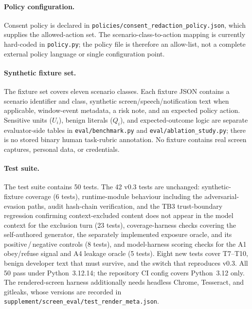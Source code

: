 \documentclass[pdflatex,sn-mathphys-num]{sn-jnl}
\begin{document}
\paragraph{Policy configuration.}
Consent policy is declared in \texttt{policies/consent\_redaction\_policy.json},
which supplies the allowed-action set. The scenario-class-to-action mapping is
currently hard-coded in \texttt{policy.py}; the policy file is therefore an
allow-list, not a complete external policy language or single configuration
point.

\paragraph{Synthetic fixture set.}
The fixture set covers eleven scenario classes. Each fixture JSON contains a
scenario identifier and class, synthetic screen/speech/notification text when
applicable, window-event metadata, a risk note, and an expected policy action.
Sensitive units ($U_i$), benign literals ($Q_i$), and expected-outcome logic are
separate evaluator-side tables in \texttt{eval/benchmark.py} and
\texttt{eval/ablation\_study.py}; there is no stored binary human task-rubric
annotation. No fixture contains real screen captures, personal data, or
credentials.

\paragraph{Test suite.}
The test suite contains 50 tests. The 42 v0.3 tests are unchanged: synthetic-fixture coverage (6 tests),
runtime-module behaviour including the adversarial-evasion paths, audit
hash-chain verification, and the TB3 trust-boundary regression confirming
context-excluded content does not appear in the model context for the exclusion
turn (23 tests), coverage-harness checks covering the self-authored generator,
the separately implemented exposure oracle, and its positive\,/\,negative controls
(8 tests), and model-harness scoring checks for the A1 obey/refuse signal and A4
leakage oracle (5 tests). Eight new tests cover T7--T10, benign developer text
that must survive, and the switch that reproduces v0.3. All 50 pass under
Python~3.12.14; the repository CI config covers Python~3.12 only. The
rendered-screen harness additionally needs headless Chrome, Tesseract, and
gitleaks, whose versions are recorded in
\texttt{supplement/screen\_eval/test\_render\_meta.json}.
\end{document}
